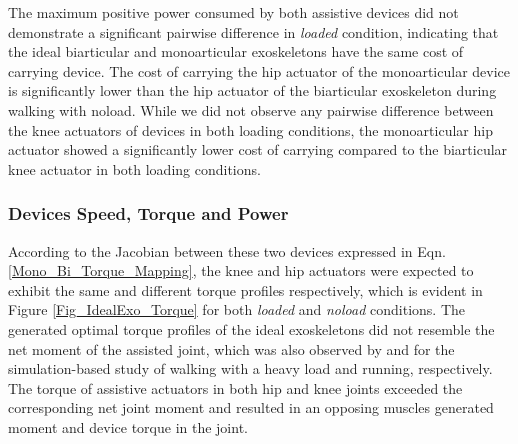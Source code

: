 \documentclass[10pt,letterpaper]{article}
\begin{document}
The maximum positive power consumed by both assistive devices did not demonstrate a significant pairwise difference in {\it loaded} condition, indicating that the ideal biarticular and monoarticular exoskeletons have the same cost of carrying device. The cost of carrying the hip actuator of the monoarticular device is significantly lower than the hip actuator of the biarticular exoskeleton during walking with noload. While we did not observe any pairwise difference between the knee actuators of devices in both loading conditions, the monoarticular hip actuator showed a significantly lower cost of carrying compared to the biarticular knee actuator in both loading conditions.\\
\subsubsection*{Devices Speed, Torque and Power}
According to the Jacobian between these two devices expressed in Eqn. \ref{Mono_Bi_Torque_Mapping}, the knee and hip actuators were expected to exhibit the same and different torque profiles respectively, which is evident in Figure \ref{Fig_IdealExo_Torque} for both \textit{loaded} and \textit{noload} conditions. The generated optimal torque profiles of the ideal exoskeletons did not resemble the net moment of the assisted joint, which was also observed by \cite{93} and \cite{2} for the simulation-based study of walking with a heavy load and running, respectively. The torque of assistive actuators in both hip and knee joints exceeded the corresponding net joint moment and resulted in an opposing muscles generated moment and device torque in the joint.\\
\end{document}
